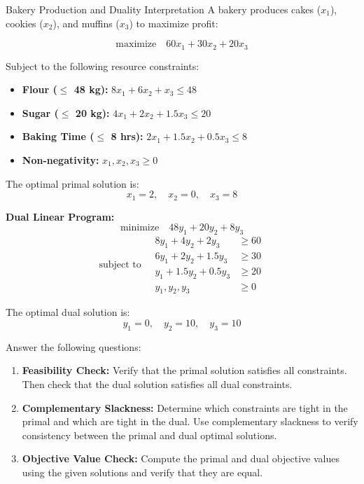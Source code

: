 \begin{ex}{Bakery Production and Duality Interpretation}{}
A bakery produces cakes ($x_1$), cookies ($x_2$), and muffins ($x_3$) to maximize profit:

\[
\text{maximize} \quad 60x_1 + 30x_2 + 20x_3
\]

Subject to the following resource constraints:
\begin{itemize}
  \item \textbf{Flour ($\leq$ 48 kg):} \quad $8x_1 + 6x_2 + x_3 \leq 48$
  \item \textbf{Sugar ($\leq$ 20 kg):} \quad $4x_1 + 2x_2 + 1.5x_3 \leq 20$
  \item \textbf{Baking Time ($\leq$ 8 hrs):} \quad $2x_1 + 1.5x_2 + 0.5x_3 \leq 8$
  \item \textbf{Non-negativity:} \quad $x_1, x_2, x_3 \geq 0$
\end{itemize}

The optimal primal solution is:
\[
x_1 = 2, \quad x_2 = 0, \quad x_3 = 8
\]

\textbf{Dual Linear Program:}
\[
\text{minimize} \quad 48y_1 + 20y_2 + 8y_3
\]
\[
\text{subject to} \quad
\begin{aligned}
8y_1 + 4y_2 + 2y_3 &\geq 60 \\
6y_1 + 2y_2 + 1.5y_3 &\geq 30 \\
y_1 + 1.5y_2 + 0.5y_3 &\geq 20 \\
y_1, y_2, y_3 &\geq 0
\end{aligned}
\]

The optimal dual solution is:
\[
y_1 = 0, \quad y_2 = 10, \quad y_3 = 10
\]

Answer the following questions:

\begin{enumerate}
  \item \textbf{Feasibility Check:}  
  Verify that the primal solution satisfies all constraints. Then check that the dual solution satisfies all dual constraints.

  \item \textbf{Complementary Slackness:}  
  Determine which constraints are tight in the primal and which are tight in the dual. Use complementary slackness to verify consistency between the primal and dual optimal solutions.

  \item \textbf{Objective Value Check:}  
  Compute the primal and dual objective values using the given solutions and verify that they are equal.


\end{enumerate}
\end{ex}
